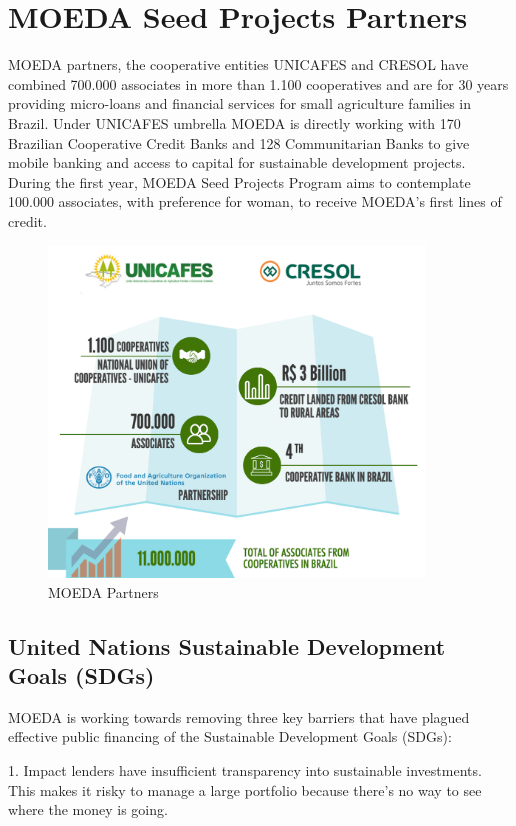 \documentclass{article}
\begin{document}
\section{MOEDA Seed Projects Partners}

MOEDA partners, the cooperative entities UNICAFES and CRESOL have combined 700.000 associates in more than 1.100 cooperatives and are for 30 years providing micro-loans and financial services for small agriculture families in Brazil. Under UNICAFES umbrella MOEDA is directly working with 170 Brazilian Cooperative Credit Banks and 128 Communitarian Banks to give mobile banking and access to capital for sustainable development projects. During the first year, MOEDA Seed Projects Program aims to contemplate 100.000 associates, with preference for woman, to receive MOEDA's first lines of credit.

\begin{figure}[h]
    \centering
    \includegraphics[width=10cm,keepaspectratio,]{bank}
    \caption{MOEDA Partners}
\end{figure}

\subsection {United Nations Sustainable Development Goals (SDGs)}

MOEDA is working towards removing three key barriers that have plagued effective public financing of the Sustainable Development Goals (SDGs):

1. Impact lenders have insufficient transparency into sustainable investments. This makes it risky to manage a large portfolio because there’s no way to see where the money is going.
\end{document}
